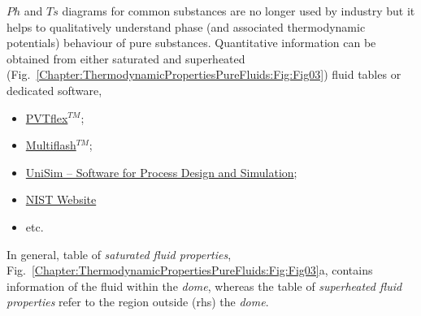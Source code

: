  $Ph$ and $Ts$ diagrams for common substances are no longer used by industry but it helps to qualitatively understand phase (and associated thermodynamic potentials) behaviour of pure substances. Quantitative information can be obtained from either saturated and superheated (Fig.~\ref{Chapter:ThermodynamicPropertiesPureFluids:Fig:Fig03}) fluid tables or dedicated software, \eg
\begin{itemize}
   \item \href{http://www.weatherford.com/doc/wft183650}{PVTflex$^{TM}$};
   \item \href{http://www.kbcat.com/infochem-software/flow-assurance-software-multiflash/pvt-simulation}{Multiflash$^{TM}$};
   \item \href{https://www.honeywellprocess.com/en-US/explore/products/advanced-applications/unisim/Pages/default.aspx}{UniSim – Software for Process Design and Simulation};
   \item \href{http://webbook.nist.gov/chemistry/fluid/}{NIST Website}
   \item etc.
\end{itemize}
In general, table of {\it saturated fluid properties}, Fig.~\ref{Chapter:ThermodynamicPropertiesPureFluids:Fig:Fig03}a, contains information of the fluid within the {\it dome}, whereas the table of {\it superheated fluid properties} refer to the region outside (rhs) the {\it dome}. 
%

